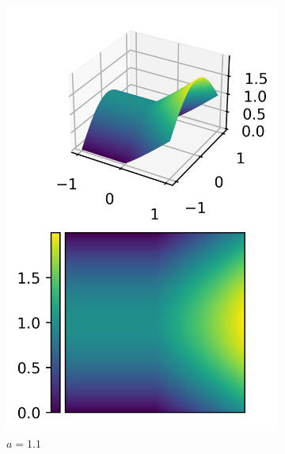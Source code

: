 \documentclass[11pt,a4paper]{article}
\begin{document}
\begin{multicols}{2}
\begin{figure}[H]
  \centering
  \begin{subfigure}{.5\linewidth}
    \centering
    \includegraphics[width=.9\linewidth]{contour_nonsmooth_1}
    \caption{$a = 1.1$}
  \end{subfigure}%
  \begin{subfigure}{.5\linewidth}
    \centering

\end{subfigure}
\end{figure}
\end{multicols}
\end{document}

